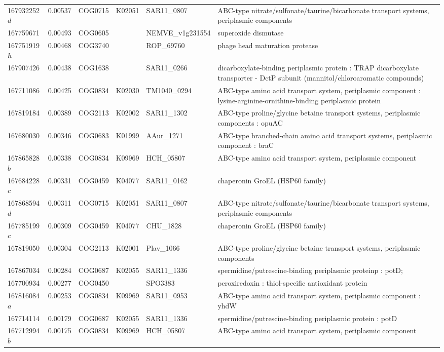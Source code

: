 \begin{landscape}
\begin{longtable}{p{1.6cm}p{1.2cm}p{1.5cm}p{1.5cm}p{2.8cm}p{13.5cm}}
167932252$d$&0.00537&COG0715&K02051&SAR11\_0807&ABC-type nitrate/sulfonate/taurine/bicarbonate transport systems, periplasmic components \\
167759671&0.00493&COG0605&&NEMVE\_v1g231554&superoxide dismutase \\
167751919$h$&0.00468&COG3740&&ROP\_69760&phage head maturation protease \\
167907426&0.00438&COG1638&&SAR11\_0266&dicarboxylate-binding periplasmic protein : TRAP dicarboxylate transporter - DctP subunit (mannitol/chloroaromatic compounds) \\
167711086&0.00425&COG0834&K02030&TM1040\_0294&ABC-type amino acid transport system, periplasmic component : lysine-arginine-ornithine-binding periplasmic protein \\
167819184&0.00389&COG2113&K02002&SAR11\_1302&ABC-type proline/glycine betaine transport systems, periplasmic components : opuAC \\
167680030&0.00346&COG0683&K01999&AAur\_1271&ABC-type branched-chain amino acid transport systems, periplasmic component : braC \\
167865828$b$&0.00338&COG0834&K09969&HCH\_05807&ABC-type amino acid transport system, periplasmic component \\
167684228$c$&0.00331&COG0459&K04077&SAR11\_0162&chaperonin GroEL (HSP60 family) \\
167868594$d$&0.00311&COG0715&K02051&SAR11\_0807&ABC-type nitrate/sulfonate/taurine/bicarbonate transport systems, periplasmic components \\
167785199$c$&0.00309&COG0459&K04077&CHU\_1828&chaperonin GroEL (HSP60 family) \\
167819050&0.00304&COG2113&K02001&Plav\_1066&ABC-type proline/glycine betaine transport systems, periplasmic components \\
167867034&0.00284&COG0687&K02055&SAR11\_1336&spermidine/putrescine-binding periplasmic proteinp : potD; \\
167700934&0.00277&COG0450&&SPO3383&peroxiredoxin : thiol-specific antioxidant protein \\
167816084$a$&0.00253&COG0834&K09969&SAR11\_0953&ABC-type amino acid transport system, periplasmic component : yhdW \\
167714114&0.00179&COG0687&K02055&SAR11\_1336&spermidine/putrescine-binding periplasmic protein : potD \\
167712994$b$&0.00175&COG0834&K09969&HCH\_05807&ABC-type amino acid transport system, periplasmic component \\

\end{longtable}
\end{landscape}
